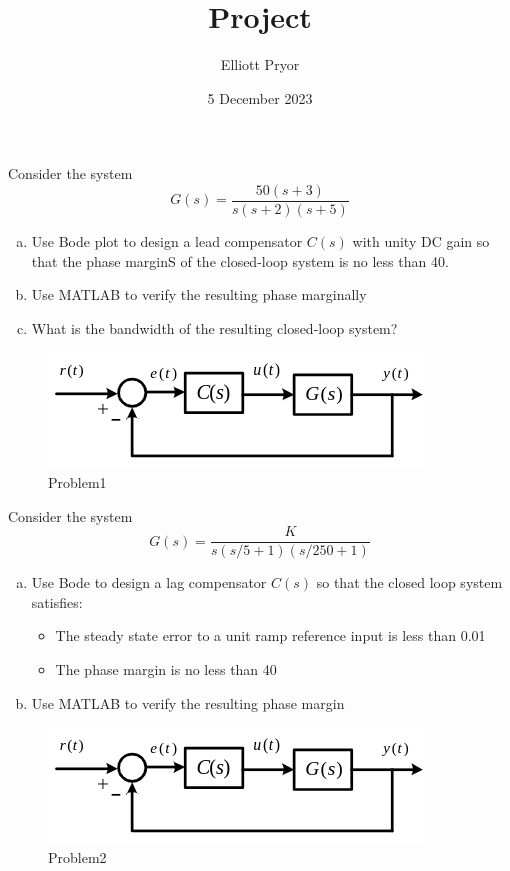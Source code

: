 \documentclass[11pt]{article}
\title{Project}
\author{Elliott Pryor}
\date{5 December 2023}
\begin{document}
\maketitle

Consider the system
$$
G(s) = \frac{50(s+3)}{s(s+2)(s+5)}
$$

\begin{enumerate}[a)]
    \item Use Bode plot to design a lead compensator $C(s)$ with unity DC gain so that the phase marginS of the closed-loop system is no less than 40\degree.
    \item Use MATLAB to verify the resulting phase marginally
    \item What is the bandwidth of the resulting closed-loop system?
\end{enumerate}

\begin{figure}[h] 
    \centering
    \includegraphics[width=0.55 \linewidth]{12-04-p1.png}
    \caption{Problem1}
    \label{fig:p1}
\end{figure}

\soln







Consider the system
$$
G(s) = \frac{K}{s(s/5 + 1)(s/250 + 1)}
$$
\begin{enumerate}[a)]
    \item Use Bode to design a lag compensator $C(s)$ so that the closed loop system satisfies:
    \begin{itemize}
        \item The steady state error to a unit ramp reference input is less than 0.01
        \item The phase margin is no less than 40\degree
    \end{itemize}
    \item Use MATLAB to verify the resulting phase margin
\end{enumerate}
\begin{figure}[h] 
    \centering
    \includegraphics[width=0.55 \linewidth]{12-04-p1.png}
    \caption{Problem2}
    \label{fig:p2}
\end{figure}
\end{document}
